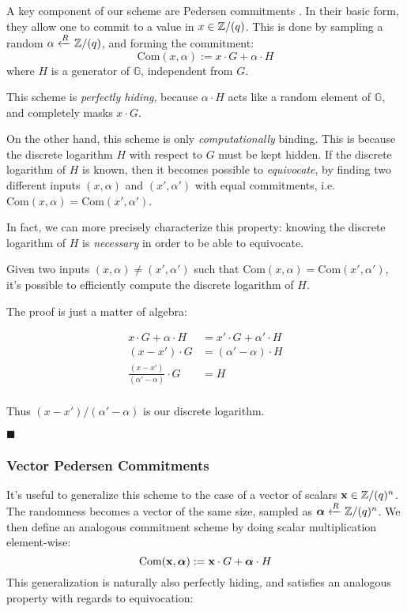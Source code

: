 A key component of our scheme are Pedersen commitments \cite{pedersen_non-interactive_1992}.
In their basic form, they allow one to commit to a value in $x \in \mathbb{Z}/(q)$. This
is done by sampling a random $\alpha \xleftarrow{R} \mathbb{Z}/(q)$, and forming the commitment:
$$
\text{Com}(x, \alpha) := x \cdot G + \alpha \cdot H
$$
where $H$ is a generator of $\mathbb{G}$, independent from $G$.

This scheme is \emph{perfectly hiding}, because $\alpha \cdot H$ acts like
a random element of $\mathbb{G}$, and completely masks $x \cdot G$.

On the other hand, this scheme is only \emph{computationally} binding. This
is because the discrete logarithm $H$ with respect to $G$ must be kept hidden.
If the discrete logarithm of $H$ is known, then it becomes possible to
\emph{equivocate}, by finding two different inputs $(x, \alpha)$ and $(x', \alpha')$ with
equal commitments, i.e. $\text{Com}(x, \alpha) = \text{Com}(x', \alpha')$.

In fact, we can more precisely characterize this property: knowing
the discrete logarithm of $H$ is \emph{necessary} in order to be able
to equivocate.

\begin{claim}
    \label{claim:ped_dlog}
    Given two inputs $(x, \alpha) \neq (x', \alpha')$ such that ${\text{Com}(x, \alpha) = \text{Com}(x', \alpha')}$,
    it's possible to efficiently compute the discrete logarithm of $H$.
\end{claim}

The proof is just a matter of algebra:

$$
\begin{aligned}
x \cdot G + \alpha \cdot H &= x' \cdot G + \alpha' \cdot H\\
(x - x') \cdot G &= (\alpha' - \alpha) \cdot H\\
\frac{(x - x')}{(\alpha' - \alpha)} \cdot G &= H\\
\end{aligned}
$$

Thus $(x - x') / (\alpha' - \alpha)$ is our discrete logarithm.

$\blacksquare$

\subsubsection{Vector Pedersen Commitments}

It's useful to generalize this scheme to the case of a vector of scalars
${\textbf{x} \in \mathbb{Z}/(q)^n}$. The randomness becomes a vector of the same
size, sampled as ${\boldsymbol{\alpha} \xleftarrow{R} \mathbb{Z}/(q)^n}$. We then define
an analogous commitment scheme by doing scalar multiplication element-wise:
$$
\text{Com}(\textbf{x}, \boldsymbol{\alpha}) := \textbf{x} \cdot G + \boldsymbol{\alpha} \cdot H
$$
This generalization is naturally also perfectly hiding, and satisfies
an analogous property with regards to equivocation:

